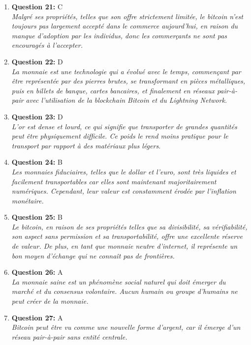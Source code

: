 \documentclass[12pt,a4paper]{article}
\begin{document}
\begin{enumerate}
\item \textbf{Question 21:} C
\\ \textit{Malgré ses propriétés, telles que son offre strictement limitée, le bitcoin n'est toujours pas largement accepté dans le commerce aujourd'hui, en raison du manque d'adoption par les individus, donc les commerçants ne sont pas encouragés à l'accepter.}

\item \textbf{Question 22:} D
\\ \textit{La monnaie est une technologie qui a évolué avec le temps, commençant par être représentée par des pierres brutes, se transformant en pièces métalliques, puis en billets de banque, cartes bancaires, et finalement en réseaux pair-à-pair avec l'utilisation de la blockchain Bitcoin et du Lightning Network.}

\item \textbf{Question 23:} D
\\ \textit{L'or est dense et lourd, ce qui signifie que transporter de grandes quantités peut être physiquement difficile. Ce poids le rend moins pratique pour le transport par rapport à des matériaux plus légers.}

\item \textbf{Question 24:} B
\\ \textit{Les monnaies fiduciaires, telles que le dollar et l'euro, sont très liquides et facilement transportables car elles sont maintenant majoritairement numériques. Cependant, leur valeur est constamment érodée par l'inflation monétaire.}

\item \textbf{Question 25:} B
\\ \textit{Le bitcoin, en raison de ses propriétés telles que sa divisibilité, sa vérifiabilité, son aspect sans permission et sa transportabilité, offre une excellente réserve de valeur. De plus, en tant que monnaie neutre d'internet, il représente un bon moyen d'échange qui ne connaît pas de frontières.}

\item \textbf{Question 26:} A
\\ \textit{La monnaie saine est un phénomène social naturel qui doit émerger du marché et du consensus volontaire. Aucun humain ou groupe d'humains ne peut créer de la monnaie.}

\item \textbf{Question 27:} A
\\ \textit{Bitcoin peut être vu comme une nouvelle forme d'argent, car il émerge d'un réseau pair-à-pair sans entité centrale.}


\end{enumerate}
\end{document}
